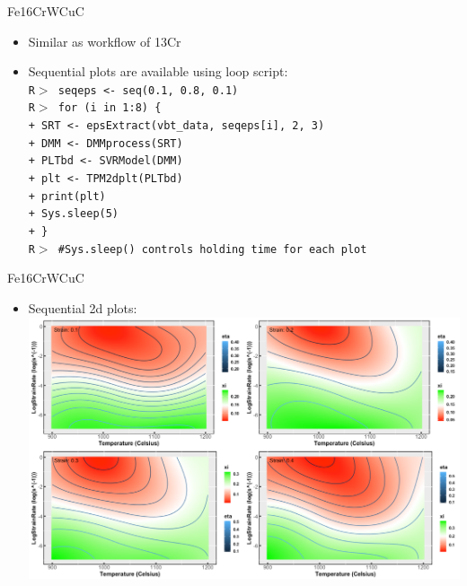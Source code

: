 \documentclass[11pt]{beamer}
\newcommand{\code}[1]{\texttt{#1}}
\begin{document}
\begin{frame}{Fe{\color{red}16Cr}WCuC}
	\begin{minipage}[t]{1\textwidth}
        \vspace{0pt}
        \begin{itemize}
        	   \item {\small Similar as workflow of 13Cr}
            \item {\small Sequential plots are available using loop script:\\
            \singlespacing
            {\scriptsize\code{R$>$ seqeps <- seq(0.1, 0.8, 0.1)\\
            R$>$ for (i in 1:8) \{\\
            \qquad + SRT <- epsExtract(vbt\_data, seqeps[i], 2, 3)\\
            \qquad + DMM <- DMMprocess(SRT)\\
            \qquad + PLTbd <- SVRModel(DMM)\\
            \qquad + plt <- TPM2dplt(PLTbd)\\
            \qquad + print(plt)\\
            \qquad + Sys.sleep(5)\\
            \qquad + \}\\
            R$>$ \#Sys.sleep() controls holding time for each plot
            }}
            }\\
        \end{itemize}
    \end{minipage}%
\end{frame}

\begin{frame}[t]{Fe{\color{red}16Cr}WCuC}
	\begin{minipage}[t]{1\textwidth}
        \vspace{0pt}
        \begin{itemize}
            \item {\small Sequential 2d plots:}
            \\
            \includegraphics[scale=0.45]{Fig10.png}
        \end{itemize}
    \end{minipage}%
\end{frame}
\end{document}
